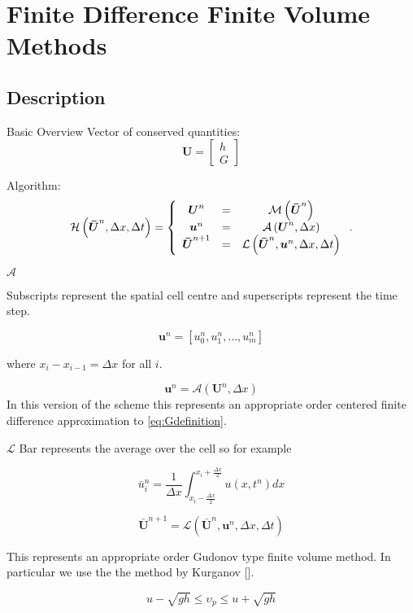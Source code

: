 \documentclass[pdf]{beamer}
\begin{document}
\section{Finite Difference Finite Volume Methods}
\subsection{Description}

\begin{frame}{Basic Overview}
Vector of conserved quantities:
\[\boldsymbol{U} = 
\left[
\begin{array}{c}
h \\
G							
\end{array} \right] \]

Algorithm:
\[\mathcal{H}\left(\boldsymbol{\bar{U}}^n,\Delta x ,\Delta t \right) = \left\lbrace 
\begin{array}{c c c} 
	\boldsymbol{U}^n &=& \mathcal{M}\left(\boldsymbol{\bar{U}}^n\right) \\
	\boldsymbol{u}^n &=& \mathcal{A}\left(\boldsymbol{U}^n, \Delta x\right) \\
	\boldsymbol{\bar{U}}^{n+1} &=& \mathcal{L}\left(\boldsymbol{\bar{U}}^{n},\boldsymbol{u}^n, \Delta x ,\Delta t\right)							
\end{array} \right. .\]
\end{frame}

\begin{frame}{$\mathcal{A}$}

Subscripts represent the spatial cell centre and superscripts represent the time step.

\[\boldsymbol{u}^n = \left[u_0^n ,u_1^n , \dots , u_m^n\right]\]

where $x_i - x_{i-1} = \Delta x$ for all $i$. 

\[	\boldsymbol{u}^n = \mathcal{A}\left(\boldsymbol{U}^n, \Delta x\right) \]
In this version of the scheme this represents an appropriate order centered finite difference approximation to \eqref{eq:Gdefinition}.
\end{frame}

\begin{frame}{$\mathcal{L}$}
Bar represents the average over the cell so for example

\[\bar{u}^n_i = \frac{1}{\Delta x}\int_{x_i - \frac{\Delta x}{2}}^{x_i + \frac{\Delta x}{2}} u(x,t^n) dx\]



\[\boldsymbol{\bar{U}}^{n+1} = \mathcal{L}\left(\boldsymbol{\bar{U}}^{n},\boldsymbol{u}^n, \Delta x ,\Delta t\right)\]

This represents an appropriate order Gudonov type finite volume method. In particular we use the the method by Kurganov [].

\[ u - \sqrt{gh}\le \upsilon_p \le u + \sqrt{gh}\]
\end{frame}
\end{document}
